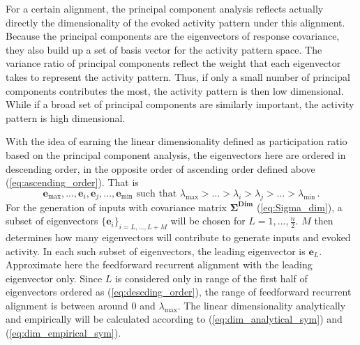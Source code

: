\documentclass[11pt]{article}
\begin{document}
	For a certain alignment, the principal component analysis reflects actually directly the dimensionality of the evoked activity pattern under this alignment. Because the principal components are the eigenvectors of response covariance, they also build up a set of basis vector for the activity pattern space. The variance ratio of principal components reflect the weight that each eigenvector takes to represent the activity pattern. Thus, if only a small number of principal components contributes the most, the activity pattern is then low dimensional. While if a broad set of principal components are similarly important, the activity pattern is high dimensional.  
	
	With the idea of earning the linear dimensionality defined as participation ratio based on the principal component analysis, the eigenvectors here are ordered in descending order, in the opposite order of ascending order defined above (\ref{eq:ascending_order}). That is 
		\begin{equation} \label{eq:descding_order}
			\mathbf{e}_{\text{max}}, ..., \mathbf{e}_i, \mathbf{e}_j, ..., \mathbf{e}_{\text{min}} \, \, \text{such that} \, \, \lambda_{\text{max}} > ...> \lambda_i > \lambda_j > ... > \lambda_{\text{min}} \, .
		\end{equation}
	For the generation of inputs with covariance matrix $\mathbf{\Sigma^{\text{Dim}}}$ (\ref{eq:Sigma_dim}), a subset of eigenvectors $\{\mathbf{e}_i\}_{i = L, ..., L+M}$ will be chosen for $L=1, ..., \frac{n}{2}$. $M$ then determines how many eigenvectors will contribute to generate inputs and evoked activity. In each such subset of eigenvectors, the leading eigenvector is $\mathbf{e}_L$. Approximate here the feedforward recurrent alignment with the leading eigenvector only. Since $L$ is considered only in range of the first half of eigenvectors ordered as (\ref{eq:descding_order}), the range of feedforward recurrent alignment is between around $0$ and $\lambda_{\text{max}}$. The linear dimensionality analytically and empirically will be calculated according to (\ref{eq:dim_analytical_sym}) and (\ref{eq:dim_empirical_sym}). 
	
\end{document}
